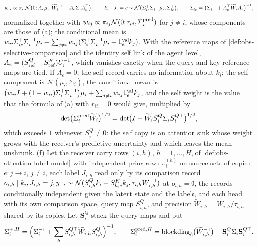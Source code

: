 \begin{equation}
w_{ii}\propto\pi_{ii}\mathcal N\bigl(0;A_e\mu_i,\widetilde W_i^{-1}
+A_e\Sigma_iA_e^\top\bigr),
\qquad
k_i\mid J_i=e\sim\mathcal N\bigl(\Sigma_{ie}^+\Sigma_i^{-1}\mu_i,\Sigma_{ie}^+\bigr),
\qquad
\Sigma_{ie}^+=\bigl(\Sigma_i^{-1}+A_e^\top\widetilde W_iA_e\bigr)^{-1},
\label{eq:obs-selective-self-component}
\end{equation}
normalized together with
\(w_{ij}\propto\pi_{ij}\mathcal N(0;r_{ij},\Sigma_i^{\rm pred})\) for
\(j\ne i\), whose components are those of (a); the conditional mean is
\(w_{ii}\Sigma_{ie}^+\Sigma_i^{-1}\mu_i+\sum_{j\ne i}w_{ij}(\Sigma_i^+\Sigma_i^{-1}\mu_i
+\mathsf L_e^{\rm val}k_j)\). With the reference maps of
\cref{def:obs-selective-comparison} and the identity self link of the agent
level, \(A_e=(S^Q_{\rm ref}-S^K_{\rm ref})U_i^{-1}\), which vanishes exactly
when the query and key reference maps are tied. If \(A_e=0\), the self record
carries no information about \(k_i\): the self component is
\(\mathcal N(\mu_i,\Sigma_i)\), the conditional mean is
\(\bigl(w_{ii}I+(1-w_{ii})\Sigma_i^+\Sigma_i^{-1}\bigr)\mu_i
+\sum_{j\ne i}w_{ij}\mathsf L_e^{\rm val}k_j\), and the self weight is the
value that the formula of (a) with \(r_{ii}=0\) would give, multiplied by
\begin{equation}
\det\bigl(\Sigma_i^{\rm pred}\widetilde W_i\bigr)^{1/2}
=\det\bigl(I+\widetilde W_iS^Q_i\Sigma_iS_i^{Q\top}\bigr)^{1/2},
\label{eq:obs-selective-self-sink}
\end{equation}
which exceeds \(1\) whenever \(S^Q_i\ne0\): the self copy is an attention sink
whose weight grows with the receiver's predictive uncertainty and which leaves
the mean unshrunk. (f) Let the receiver carry rows \((i,h)\), \(h=1,\ldots,H\),
of \cref{def:obs-attention-label-model} with independent prior rows
\(\pi_i^{(h)}\) on source sets of copies \(e:j\to i\), \(j\ne i\), each label
\(J_{i,h}\) read only by its comparison record
\(o_{i,h}\mid k_i,J_{i,h}=j,y_{-i}\sim\mathcal N(S^Q_{i,h}k_i-S^K_{h,e}k_j,
\tau_{i,h}W_{i,h}^{-1})\) at \(o_{i,h}=0\), the records conditionally
independent given the latent state and the labels, and each head with its own
comparison space, query map \(S^Q_{i,h}\), and precision
\(\widetilde W_{i,h}=W_{i,h}/\tau_{i,h}\) shared by its copies. Let
\(\mathbf S^Q_i\) stack the query maps and put
\begin{equation}
\Sigma_i^{+,H}=\Bigl(\Sigma_i^{-1}+\sum_hS_{i,h}^{Q\top}\widetilde W_{i,h}S^Q_{i,h}\Bigr)^{-1},
\qquad
\Sigma_i^{{\rm pred},H}=\operatorname{blockdiag}_h\bigl(\widetilde W_{i,h}^{-1}\bigr)
+\mathbf S^Q_i\Sigma_i\mathbf S_i^{Q\top}.
\label{eq:obs-selective-multihead-covariances}
\end{equation}
